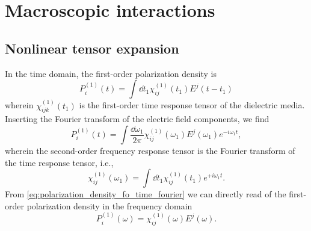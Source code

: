 \chapter{Macroscopic interactions}

\section{Nonlinear tensor expansion}\label{sec:polarization_density_susceptibility}

In the time domain, the first-order polarization density is~\cite[p.~17]{Murti2014}
\begin{equation}
	P_i^{(1)}(t)
	=
	\int\dd{t_1}
	\chi^{(1)}_{ij}(t_1)
	E^j(t-t_1)
	\label{eq:polarization_density_fo_time}
\end{equation}
wherein $\chi^{(1)}_{ijk}(t_1)$ is the first-order time response tensor of the dielectric media.
Inserting the Fourier transform of the electric field components, we find
\begin{equation}
	P_i^{(1)}(t)
	=
	\int\frac{\dd{\omega_1}}{2\pi}
	\chi^{(1)}_{ij}(\omega_1)
	E^j(\omega_1)
	e^{-i\omega_1t}
	\label{eq:polarization_density_fo_time_fourier}
	,
\end{equation}
wherein the second-order frequency response tensor is the Fourier transform of the time response tensor, i.e.,
\begin{equation}
	\chi^{(1)}_{ij}(\omega_1)
	=
	\int\dd{t_1}
	\chi^{(1)}_{ij}(t_1)
	e^{+i\omega_1t}
	.
\end{equation}
From \cref{eq:polarization_density_fo_time_fourier} we can directly read of the first-order polarization density in the frequency domain
\begin{equation}
	P_i^{(1)}(\omega)
	=
	\chi^{(1)}_{ij}(\omega)
	E^j(\omega)
	.
	\label{eq:polarization_density_fo_freq}
\end{equation}

